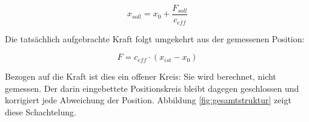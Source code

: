 \begin{equation}
    x_{soll} = x_0 + \frac{F_{soll}}{c_{eff}}
    \label{eq:kraft_vorsteuerung}
\end{equation}

Die tatsächlich aufgebrachte Kraft folgt umgekehrt aus der gemessenen Position:

\begin{equation}
    F = c_{eff} \cdot (x_{ist} - x_0)
    \label{eq:kraft_rueckrechnung}
\end{equation}

Bezogen auf die Kraft ist dies ein offener Kreis: Sie wird berechnet, nicht gemessen. Der
darin eingebettete Positionskreis bleibt dagegen geschlossen und korrigiert jede
Abweichung der Position. Abbildung \ref{fig:gesamtstruktur} zeigt diese Schachtelung.

